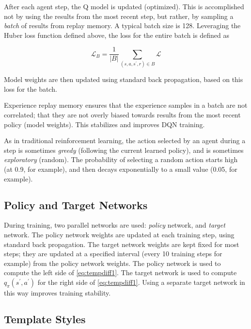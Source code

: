 \documentclass[acmlarge,screen]{acmart}
\begin{document}
After each agent step, the Q model is updated (optimized).
This is accomplished not by using the results from the most recent step, but rather, by sampling a \textit{batch}
of results from replay memory. 
A typical batch size is 128.
Leveraging the Huber loss function defined above, the loss for the entire batch is defined as

\begin{equation}  \label{eq:batchloss}
  \mathcal{L}_B = \frac{1}{\lvert B \rvert} \sum_{ \left( s,a,s^\prime , r \right) \in B}  \mathcal{L}
\end{equation}

\noindent Model weights are then updated using standard back propagation, based on this loss for the batch.

Experience replay memory ensures that the experience samples in a batch are not correlated;
that they are not overly biased towards results from the most recent policy (model weights).
This stabilizes and improves DQN training.

As in traditional reinforcement learning, the action selected by an agent during a step is sometimes 
\textit{greedy} (following the current learned policy), and is sometimes \textit{exploratory} (random).
The probability of selecting a random action starts high (at 0.9, for example), and then decays exponentially to
a small value (0.05, for example).



\subsection{Policy and Target Networks}

During training, two parallel networks are used:  \textit{policy} network, and \textit{target} network.  
The policy network weights are updated at each training step, using standard back propagation.
The target network weights are kept fixed for most steps;  they are updated at a specified interval
(every 10 training steps for example) from the policy network weights.
The policy network is used to compute the left side of \ref{eq:tempdiff1}.  
The target network is used to compute $q_\pi (s^\prime, a^\prime)$ for the right side of \ref{eq:tempdiff1}.  
Using a separate target network in this way improves training stability.



\subsection{Template Styles}
\end{document}

